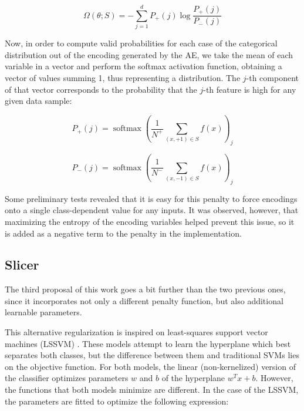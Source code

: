 \documentclass[
	fontsize=11pt, %
	twoside=false, %
	open=any, %
	secnumdepth=1, %
]{kaobook}
\begin{document}
\begin{equation} \Omega(\theta;S)=- \sum_{j=1}^{d}P_+(j) \log\frac{P_+(j)}{P_-(j)}\end{equation}


Now, in order to compute valid probabilities for each case of the categorical distribution out of the encoding generated by the AE, we take the mean of each variable in a vector and perform the softmax activation function, obtaining a vector of values summing 1, thus representing a distribution. The $j$-th component of that vector corresponds to the probability that the $j$-th feature is high for any given data sample:

\begin{equation} P_+(j)=\operatorname{softmax}\left(\frac{1}{N^{+}}\sum_{(x,+1)\in S}f(x)\right)_j \end{equation}

\begin{equation} P_-(j)=\operatorname{softmax}\left(\frac{1}{N^{-}}\sum_{(x,-1)\in S}f(x)\right)_j \end{equation}

Some preliminary tests revealed that it is easy for this penalty to force encodings onto a single class-dependent value for any inputs. It was observed, however, that maximizing the entropy of the encoding variables helped prevent this issue, so it is added as a negative term to the penalty in the implementation.

\subsection{Slicer}

The third proposal of this work goes a bit further than the two previous ones, since it incorporates not only a different penalty function, but also additional learnable parameters.

This alternative regularization is inspired on least-squares support vector machines (LSSVM) \cite{suykens1999least}. These models attempt to learn the hyperplane which best separates both classes, but the difference between them and traditional SVMs lies on the objective function. For both models, the linear (non-kernelized) version of the classifier optimizes parameters $w$ and $b$ of the hyperplane $w^Tx+b$. However, the functions that both models minimize are different. In the case of the LSSVM, the parameters are fitted to optimize the following expression:
\end{document}
